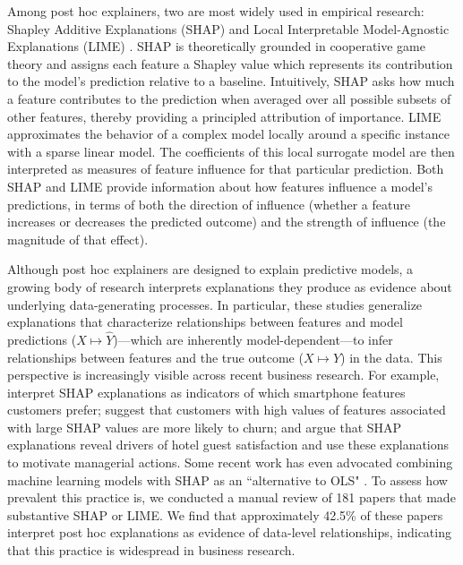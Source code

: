 \documentclass[11pt]{article}
\begin{document}
Among post hoc explainers, two are most widely used in empirical research: Shapley Additive Explanations (SHAP) \citep{lundberg17shap} and Local Interpretable Model-Agnostic Explanations (LIME) \citep{ribeiro16lime}. SHAP is theoretically grounded in cooperative game theory and assigns each feature a Shapley value which represents its contribution to the model’s prediction relative to a baseline. Intuitively, SHAP asks how much a feature contributes to the prediction when averaged over all possible subsets of other features, thereby providing a principled attribution of importance. LIME approximates the behavior of a complex model locally around a specific instance with a sparse linear model. %
The coefficients of this local surrogate model are then interpreted as measures of feature influence for that particular prediction. Both SHAP and LIME provide information about how features influence a model’s predictions, in terms of both the direction of influence (whether a feature increases or decreases the predicted outcome) and the strength of influence (the magnitude of that effect). %

Although post hoc explainers are designed to explain predictive models, a growing body of research interprets explanations they produce as evidence about underlying data-generating processes. In particular, these studies generalize explanations that characterize relationships between features and model predictions ($X \mapsto \hat{Y}$)—which are inherently model-dependent—to infer relationships between features and the true outcome ($X \mapsto Y$) in the data. This perspective is increasingly visible across recent business research. For example, \citet{park2024extracting} interpret SHAP explanations as indicators of which smartphone features customers prefer; \citet{jiang24churn} suggest that customers with high values of features associated with large SHAP values are more likely to churn; and \citet{sanchez2023role} argue that SHAP explanations reveal drivers of hotel guest satisfaction and use these explanations to motivate managerial actions. Some recent work has even advocated combining machine learning models with SHAP as an ``alternative to OLS" \citep{berger2023supply}.
To assess how prevalent this practice is, we conducted a manual review of 181 papers that made substantive SHAP or LIME. We find that approximately 42.5\% of these papers interpret post hoc explanations as evidence of data-level relationships, indicating that this practice is widespread in business research.%
\end{document}
